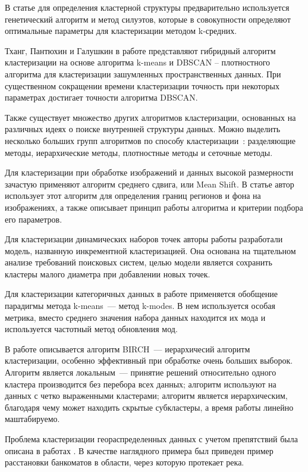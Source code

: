 В статье \cite{genetic} для определения кластерной структуры предварительно используется генетический алгоритм и метод силуэтов, которые в совокупности определяют оптимальные параметры для кластеризации методом k-средних.

Тханг, Пантюхин и Галушкин в работе \cite{FDBSCAN} представляют гибридный алгоритм кластеризации на основе алгоритма k-means и DBSCAN – плотностного алгоритма для кластеризации зашумленных пространственных данных. При существенном сокращении времени кластеризации точность при некоторых параметрах достигает точности алгоритма DBSCAN.

Также существует множество других алгоритмов кластеризации, основанных на различных идеях о поиске внутренней структуры данных. Можно выделить несколько больших групп алгоритмов по способу кластеризации~\cite{cod}: разделяющие методы, иерархические методы, плотностные методы и сеточные методы.

Для кластеризации при обработке изображений и данных высокой размерности зачастую применяют алгоритм среднего сдвига, или Mean Shift. В статье \cite{ms} автор использует этот алгоритм для определения границ регионов и фона на изображениях, а также описывает принцип работы алгоритма и критерии подбора его параметров.

Для кластеризации динамических наборов точек авторы работы \cite{inc} разработали модель, названную инкрементной кластеризацией. Она основана на тщательном анализе требований поисковых систем, целью модели является сохранить кластеры малого диаметра при добавлении новых точек.

Для кластеризации категоричных данных в работе \cite{huang} применяется обобщение парадигмы метода k-means~--- метод k-modes. В нем используется особая метрика, вместо среднего значения набора данных находится их мода и используется частотный метод обновления мод.

В работе \cite{birch} описывается алгоритм BIRCH~--- иерархичесий алгоритм кластеризации, особенно эффективный при обработке очень больших выборок. Алгоритм является локальным~--- принятие решений относительно одного кластера производится без перебора всех данных; алгоритм используют на данных с четко выраженными кластерами; алгоритм является иерархическим, благодаря чему может находить скрытые субкластеры, а время работы линейно маштабируемо.

Проблема кластеризации геораспределенных данных с учетом препятствий была описана в работах \cite{presence, cod}. В качестве наглядного примера был приведен пример расстановки банкоматов в области, через которую протекает река.

